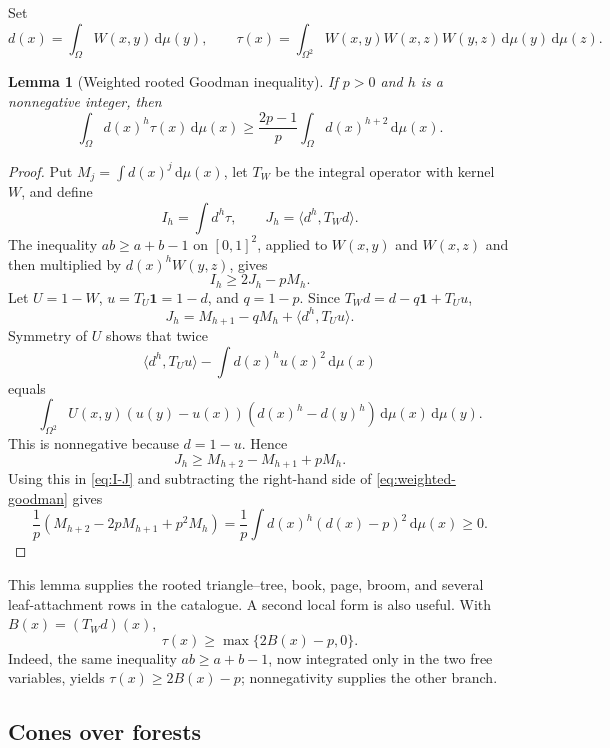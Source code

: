 \documentclass[11pt]{article}
\numberwithin{equation}{section}
\newtheorem{lemma}[theorem]{Lemma}
\theoremstyle{definition}
\theoremstyle{remark}
\newcommand{\dd}{\,\mathrm d}
\newcommand{\one}{\mathbf 1}
\newcommand{\ip}[2]{\langle #1,#2\rangle}
\begin{document}
Set
\begin{equation}
 d(x)=\int_\Omega W(x,y)\dd\mu(y),
 \qquad
 \tau(x)=\int_{\Omega^2}W(x,y)W(x,z)W(y,z)
 \dd\mu(y)\dd\mu(z).
 \label{eq:rooted-quantities}
\end{equation}

\begin{lemma}[Weighted rooted Goodman inequality]
\label{lem:weighted-goodman}
If $p>0$ and $h$ is a nonnegative integer, then
\begin{equation}
 \int_\Omega d(x)^h\tau(x)\dd\mu(x)
 \geq \frac{2p-1}{p}\int_\Omega d(x)^{h+2}\dd\mu(x).
 \label{eq:weighted-goodman}
\end{equation}
\end{lemma}

\begin{proof}
Put $M_j=\int d(x)^j\dd\mu(x)$, let $T_W$ be the integral operator with
kernel $W$, and define
\[
 I_h=\int d^h\tau,
 \qquad
 J_h=\ip{d^h}{T_Wd}.
\]
The inequality $ab\geq a+b-1$ on $[0,1]^2$, applied to $W(x,y)$ and
$W(x,z)$ and then multiplied by $d(x)^hW(y,z)$, gives
\begin{equation}
 I_h\geq2J_h-pM_h.
 \label{eq:I-J}
\end{equation}
Let $U=1-W$, $u=T_U\one=1-d$, and $q=1-p$.  Since
$T_Wd=d-q\one+T_Uu$,
\begin{equation}
 J_h=M_{h+1}-qM_h+\ip{d^h}{T_Uu}.
 \label{eq:J-decomposition}
\end{equation}
Symmetry of $U$ shows that twice
\[
 \ip{d^h}{T_Uu}-\int d(x)^hu(x)^2\dd\mu(x)
\]
equals
\[
 \int_{\Omega^2}U(x,y)(u(y)-u(x))(d(x)^h-d(y)^h)
 \dd\mu(x)\dd\mu(y).
\]
This is nonnegative because $d=1-u$.  Hence
\[
 J_h\geq M_{h+2}-M_{h+1}+pM_h.
\]
Using this in \eqref{eq:I-J} and subtracting the right-hand side of
\eqref{eq:weighted-goodman} gives
\[
 \frac1p\left(M_{h+2}-2pM_{h+1}+p^2M_h\right)
 =\frac1p\int d(x)^h(d(x)-p)^2\dd\mu(x)\geq0.
\]
\end{proof}

This lemma supplies the rooted triangle--tree, book, page, broom, and several
leaf-attachment rows in the catalogue.  A second local form is also useful.
With $B(x)=(T_Wd)(x)$,
\begin{equation}
 \tau(x)\geq\max\{2B(x)-p,0\}.
 \label{eq:pointwise-goodman}
\end{equation}
Indeed, the same inequality $ab\geq a+b-1$, now integrated only in the two
free variables, yields $\tau(x)\geq2B(x)-p$; nonnegativity supplies the other
branch.

\subsection{Cones over forests}
\end{document}
